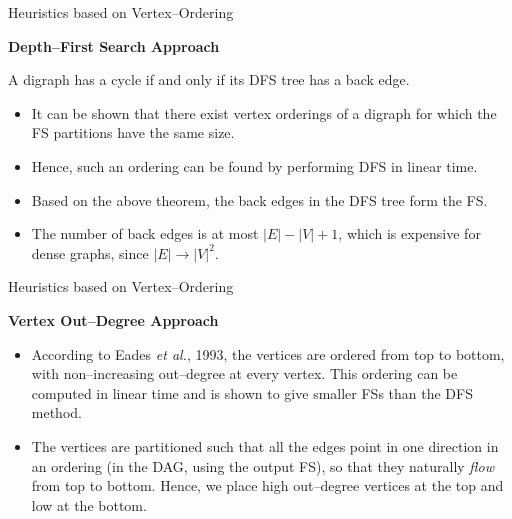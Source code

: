\documentclass{beamer}
\begin{document}
\begin{frame}{Heuristics based on Vertex–Ordering}
    

    \textbf{Depth–First Search Approach}

    \begin{theorem}
        
        A digraph has a cycle if and only if its DFS tree has a back edge.

    \end{theorem}

    \begin{itemize}
        
        \item It can be shown that there exist vertex orderings of a digraph for which the FS partitions have the same size.
        \item Hence, such an ordering can be found by performing DFS in linear time.
        \item Based on the above theorem, the back edges in the DFS tree form the FS.
        \item The number of back edges is at most $|E| - |V| + 1$, which is expensive for dense graphs, since $|E| \rightarrow |V|^2$.

    \end{itemize}


\end{frame}



\begin{frame}{Heuristics based on Vertex–Ordering}


    \textbf{Vertex Out–Degree Approach}

    \begin{itemize}

        \item According to Eades \textit{et al.}, 1993, the vertices are ordered from top to bottom, with non–increasing out–degree at every vertex. This ordering can be computed in linear time and is shown to give smaller FSs than the DFS method.

        \item The vertices are partitioned such that all the edges point in one direction in an ordering (in the DAG, using the output FS), so that they naturally \textit{flow} from top to bottom. Hence, we place high out–degree vertices at the top and low at the bottom.

    \end{itemize}


\end{frame}
\end{document}
